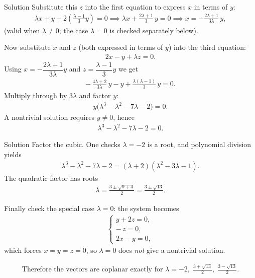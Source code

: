 \documentclass{beamer}
\numberwithin{equation}{section}
\theoremstyle{remark}
\begin{document}
\begin{frame}{Solution}
Substitute this \(z\) into the first equation to express \(x\) in terms of \(y\):
\begin{align*}
\lambda x + y + 2\!\left(\frac{\lambda-1}{3}y\right)=0
\implies
\lambda x + \frac{2\lambda+1}{3}\,y = 0
\implies
x = -\frac{2\lambda+1}{3\lambda}\,y,
\end{align*}
(valid when \(\lambda\neq0\); the case \(\lambda=0\) is checked separately below).

Now substitute \(x\) and \(z\) (both expressed in terms of \(y\)) into the third equation:
\begin{align*}
2x - y + \lambda z = 0.
\end{align*}
Using \(x=-\dfrac{2\lambda+1}{3\lambda}y\) and \(z=\dfrac{\lambda-1}{3}y\) we get
\begin{align*}
-\,\frac{4\lambda+2}{3\lambda}\,y - y + \frac{\lambda(\lambda-1)}{3}\,y = 0.
\end{align*}
Multiply through by \(3\lambda\) and factor \(y\):
\begin{align*}
y\bigl(\lambda^3-\lambda^2-7\lambda-2\bigr)=0.
\end{align*}
A nontrivial solution requires \(y\neq0\), hence
\begin{align*}
\lambda^3-\lambda^2-7\lambda-2=0.
\end{align*}
\end{frame}

\begin{frame}{Solution}
Factor the cubic. One checks \(\lambda=-2\) is a root, and polynomial division yields
\begin{align*}
\lambda^3-\lambda^2-7\lambda-2=(\lambda+2)(\lambda^2-3\lambda-1).
\end{align*}
The quadratic factor has roots
\begin{align*}
\lambda=\frac{3\pm\sqrt{9+4}}{2}=\frac{3\pm\sqrt{13}}{2}.
\end{align*}

Finally check the special case \(\lambda=0\): the system becomes
\begin{align*}
\begin{cases}
y+2z=0,\\
-\,z=0,\\
2x-y=0,
\end{cases}
\end{align*}
which forces \(x=y=z=0\), so \(\lambda=0\) does \emph{not} give a nontrivial solution.

\begin{align*}
\boxed{\text{Therefore the vectors are coplanar exactly for }
\lambda=-2,\;\frac{3+\sqrt{13}}{2},\;\frac{3-\sqrt{13}}{2}.}
\end{align*}
\end{frame}
\end{document}
